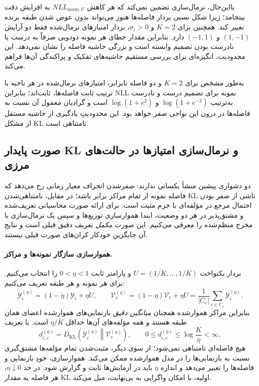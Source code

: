 بااین‌حال، نرمال‌سازی تضمین نمی‌کند که هر کاهش $NLL_{\mathrm{norm},U}$ به افزایش دقت بینجامد؛ زیرا شکل نسبی بردار فاصله‌ها هنوز می‌تواند بدون عوض شدن طبقه برنده تغییر کند. همچنین برای $K=2$ و $\sigma_i>0$، بردار امتیازهای نرمال‌شده فقط دو آرایش $(1,-1)$ و $(-1,1)$ دارد. بنابراین مقدار خطای هر نمونه دودویی صرفاً به درست یا نادرست بودن تصمیم وابسته است و بزرگی حاشیه فاصله را نشان نمی‌دهد. این محدودیت، انگیزه‌ای برای بررسی مستقیم حاشیه‌های تفکیک و پراکندگی آن‌ها فراهم می‌کند.

به‌طور مشخص برای $K=2$ و دو فاصله نابرابر،
امتیازهای نرمال‌شده در هر ناحیه با ترتیب ثابت
فاصله‌ها، ثابت‌اند؛ بنابراین NLL نمونه
برای تصمیم درست و نادرست به‌ترتیب
$\log(1+e^{-2})$ و $\log(1+e^2)$ است
و گرادیان معمول آن نسبت به فاصله‌ها
در درون این نواحی صفر خواهد بود.
این محدودیتِ یادگیری از حاشیه مستقل
از مشکل KL نامتناهی است.





\subsection{صورت پایدار KL و نرمال‌سازی امتیازها در حالت‌های مرزی}
\label{subsec:ch3-stable-KL-normalization}
دو دشواری پیشین منشأ یکسانی ندارند: صفرشدن
انحراف معیار زمانی رخ می‌دهد که فاصله نمونه
از تمام مراکز برابر باشد؛ در مقابل،
نامتناهی‌شدن KL ناشی از صفر بودن
احتمال مرجع در مؤلفه‌ای با جرم مثبت است.
برای ارائه صورت محاسباتی تعریف‌شده و
مشتق‌پذیر در هر دو وضعیت، ابتدا
هموارسازی توزیع‌ها و سپس یک نرمال‌سازی
با مخرج منظم‌شده را معرفی می‌کنیم.
این صورت \emph{مکمل} تعریف دقیق قبلی است
و نتایج آن جایگزین خودکار کران‌های
صورت قبلی نیستند.

\paragraph{هموارسازی سازگار نمونه‌ها و مراکز.}
بردار یکنواخت $U=(1/K,\ldots,1/K)$ و
پارامتر ثابت $0<\eta<1$ را انتخاب می‌کنیم.
برای هر نمونه و هر طبقه تعریف می‌کنیم:
\begin{equation}\label{eq:ch3-stable-smoothed-representations}
\boxed{
\mathscr Y_i^{(\eta)}=(1-\eta)\mathscr Y_i+\eta U,
\qquad
\mathcal V_c^{(\eta)}=(1-\eta)\mathcal V_c+\eta U
=\frac1{|C_c|}\sum_{i\in C_c}\mathscr Y_i^{(\eta)}.
}
\end{equation}
بنابراین مراکز هموارشده همچنان
\emph{میانگین دقیق} بازنمایی‌های هموارشده
اعضای همان طبقه هستند و همه مؤلفه‌های
آن‌ها حداقل $\eta/K$ است. با تعریف
\begin{equation}\label{eq:ch3-stable-KL-distance}
d_{i,c}^{(\eta)}
=D_{\mathrm{KL}}\!\left(
\mathscr Y_i^{(\eta)}\middle\|\mathcal V_c^{(\eta)}
\right),
\qquad
0\le d_{i,c}^{(\eta)}\le\log\frac K\eta<\infty,
\end{equation}
هیچ فاصله‌ای نامتناهی نمی‌شود؛
از سوی دیگر، مثبت‌شدن تمام مؤلفه‌ها
مشتق‌گیری نسبت به بازنمایی‌ها را
در مدل هموارشده ممکن می‌کند.
هموارسازی، خودِ بازنمایی و فاصله‌ها
را تغییر می‌دهد و اندازه $\eta$
باید در آزمایش‌ها ثابت و گزارش شود.
در حد $\eta\downarrow0$، هر فاصله
به مقدار KL اولیه، با امکان واگرایی
به بی‌نهایت، میل می‌کند.

